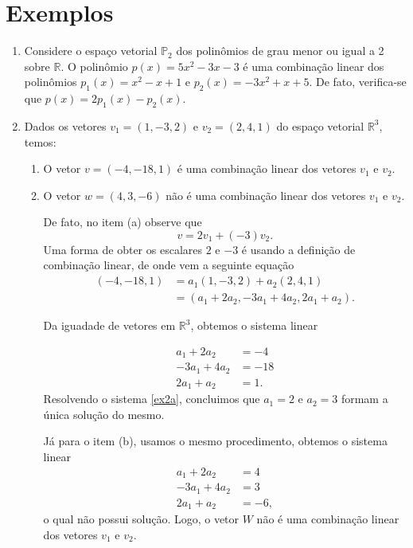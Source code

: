 \section{Exemplos}
\begin{enumerate}
\item  Considere o espaço vetorial  $\mathbb{P}_2$ dos polinômios de grau menor  ou igual a 2 sobre $\mathbb{R}$. O polinômio $p(x)=5x^2-3x-3$ é uma combinação linear dos polinômios $p_1(x)=x^2-x+1$ e $p_2(x)=-3x^2+x+5$. De fato, verifica-se que $p(x)=2p_1(x)-p_2(x)$.

\item Dados os vetores $v_1=(1,-3,2)$ e $v_2=(2,4,1)$ do espaço vetorial  $\mathbb{R}^3$, temos:
  \begin{enumerate}[label=(\alph*)]
\item O vetor $v=(-4,-18,1)$ é uma combinação linear dos vetores $v_1$ e $v_2$.
\item O vetor $w=(4,3,-6)$  não é uma combinação linear dos vetores $v_1$ e $v_2$.

De fato, no item (a) observe que $$v=2v_1+(-3)v_2.$$  Uma forma de obter os escalares $2$ e $-3$  é  usando a definição de combinação linear, de onde vem a seguinte equação
\begin{align*}(-4,-18,1)&=a_1(1,-3,2)+a_2(2,4,1)\\
                                    &=(a_1+2a_2, -3a_1+4a_2,2a_1+a_2).
\end{align*}

Da iguadade de vetores em $\mathbb{R}^3$, obtemos o sistema linear

\begin{align}
a_1+2a_2&=-4 \nonumber  \\
-3a_1+4a_2 &=-18\nonumber \\
2a_1+a_2&=1. \label{ex2a}
\end{align}
Resolvendo o sistema \eqref{ex2a}, concluimos que $a_1=2$ e $a_2=3$ formam a única solução do mesmo.

Já para o item (b), usamos o mesmo procedimento, obtemos o sistema linear
\begin{align} a_1+2a_2&=4 \nonumber  \\ -3a_1+4a_2 &=3\nonumber \\ 2a_1+a_2&=-6, \label{ex2b}\end{align}   o qual não possui solução. Logo, o vetor $ W$ não é uma combinação linear dos vetores $v_1$ e $v_2$.

\end{enumerate}


\end{enumerate}

